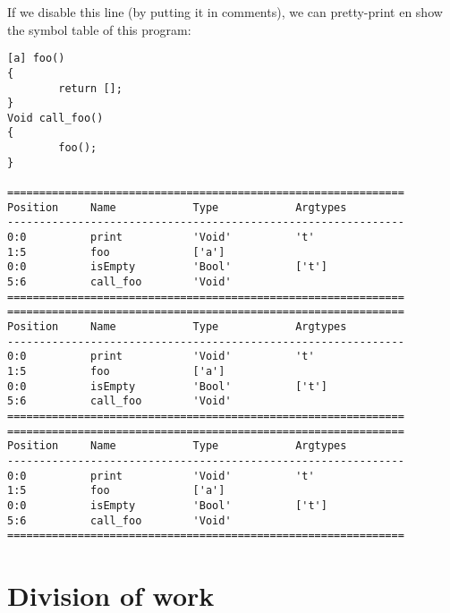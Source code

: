 \documentclass[a4paper]{article}
\begin{document}
If we disable this line (by putting it in comments), we can pretty-print en show the symbol table of this program:
\begin{verbatim}
[a] foo()
{
        return [];
}
Void call_foo()
{
        foo();
}

==============================================================
Position     Name            Type            Argtypes            
--------------------------------------------------------------
0:0          print           'Void'          't'                 
1:5          foo             ['a']                               
0:0          isEmpty         'Bool'          ['t']               
5:6          call_foo        'Void'                              
==============================================================
==============================================================
Position     Name            Type            Argtypes            
--------------------------------------------------------------
0:0          print           'Void'          't'                 
1:5          foo             ['a']                               
0:0          isEmpty         'Bool'          ['t']               
5:6          call_foo        'Void'                              
==============================================================
==============================================================
Position     Name            Type            Argtypes            
--------------------------------------------------------------
0:0          print           'Void'          't'                 
1:5          foo             ['a']                               
0:0          isEmpty         'Bool'          ['t']               
5:6          call_foo        'Void'                              
==============================================================
\end{verbatim}

\newpage %
\section{Division of work}
\end{document}
